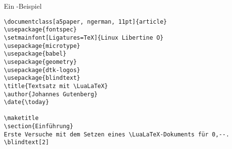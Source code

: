 \begin{frame}[fragile]{Ein \LuaLaTeX{}-Beispiel}
\begin{lstlisting}[style=tex]
%% Ein lualatex-Beispiel
\documentclass[a5paper, ngerman, 11pt]{article}
\usepackage{fontspec}
\setmainfont[Ligatures=TeX]{Linux Libertine O}
\usepackage{microtype}
\usepackage{babel}
\usepackage{geometry}
\usepackage{dtk-logos}
\usepackage{blindtext}
\title{Textsatz mit \LuaLaTeX}
\author{Johannes Gutenberg}
\date{\today}

\maketitle
\section{Einführung}
Erste Versuche mit dem Setzen eines \LuaLaTeX-Dokuments für 0,--.
\blindtext[2]

\end{lstlisting}
\end{frame}